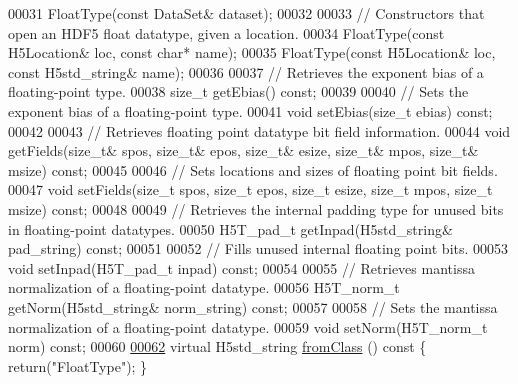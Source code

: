 \begin{DoxyCode}
00031         FloatType(\textcolor{keyword}{const} DataSet& dataset);
00032 
00033         \textcolor{comment}{// Constructors that open an HDF5 float datatype, given a location.}
00034         FloatType(\textcolor{keyword}{const} H5Location& loc, \textcolor{keyword}{const} \textcolor{keywordtype}{char}* name);
00035         FloatType(\textcolor{keyword}{const} H5Location& loc, \textcolor{keyword}{const} H5std\_string& name);
00036 
00037         \textcolor{comment}{// Retrieves the exponent bias of a floating-point type.}
00038         \textcolor{keywordtype}{size\_t} getEbias() \textcolor{keyword}{const};
00039 
00040         \textcolor{comment}{// Sets the exponent bias of a floating-point type.}
00041         \textcolor{keywordtype}{void} setEbias(\textcolor{keywordtype}{size\_t} ebias) \textcolor{keyword}{const};
00042 
00043         \textcolor{comment}{// Retrieves floating point datatype bit field information.}
00044         \textcolor{keywordtype}{void} getFields(\textcolor{keywordtype}{size\_t}& spos, \textcolor{keywordtype}{size\_t}& epos, \textcolor{keywordtype}{size\_t}& esize, \textcolor{keywordtype}{size\_t}& mpos, \textcolor{keywordtype}{size\_t}& msize) \textcolor{keyword}{const};
00045 
00046         \textcolor{comment}{// Sets locations and sizes of floating point bit fields.}
00047         \textcolor{keywordtype}{void} setFields(\textcolor{keywordtype}{size\_t} spos, \textcolor{keywordtype}{size\_t} epos, \textcolor{keywordtype}{size\_t} esize, \textcolor{keywordtype}{size\_t} mpos, \textcolor{keywordtype}{size\_t} msize) \textcolor{keyword}{const};
00048 
00049         \textcolor{comment}{// Retrieves the internal padding type for unused bits in floating-point datatypes.}
00050         H5T\_pad\_t getInpad(H5std\_string& pad\_string) \textcolor{keyword}{const};
00051 
00052         \textcolor{comment}{// Fills unused internal floating point bits.}
00053         \textcolor{keywordtype}{void} setInpad(H5T\_pad\_t inpad) \textcolor{keyword}{const};
00054 
00055         \textcolor{comment}{// Retrieves mantissa normalization of a floating-point datatype.}
00056         H5T\_norm\_t getNorm(H5std\_string& norm\_string) \textcolor{keyword}{const};
00057 
00058         \textcolor{comment}{// Sets the mantissa normalization of a floating-point datatype.}
00059         \textcolor{keywordtype}{void} setNorm(H5T\_norm\_t norm) \textcolor{keyword}{const};
00060 
\hyperlink{class_h5_1_1_float_type_a5977cef7ad7a91fa7b922672cab515f7}{00062}         \textcolor{keyword}{virtual} H5std\_string \hyperlink{class_h5_1_1_float_type_a5977cef7ad7a91fa7b922672cab515f7}{fromClass} ()\textcolor{keyword}{ const }\{ \textcolor{keywordflow}{return}(\textcolor{stringliteral}{"FloatType"}); \}

\end{DoxyCode}
